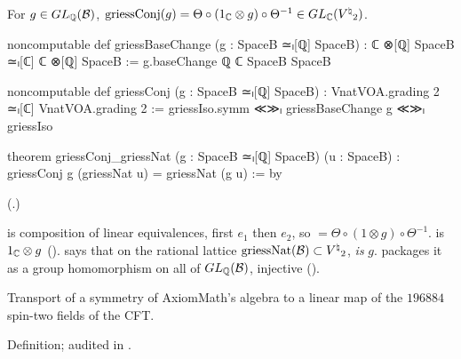 \begin{definition}\label{ch21:def:griessConj}
For $g\in GL_{\mathbb{Q}}(\mathcal{B})$, $\mathrm{griessConj}(g)=\Theta\circ(1_{\mathbb{C}}\otimes g)\circ\Theta^{-1}\in GL_{\mathbb{C}}({V^{\natural}}_2)$.
\end{definition}
\begin{leancode}
noncomputable def griessBaseChange (g : SpaceB ≃ₗ[ℚ] SpaceB) : ℂ ⊗[ℚ] SpaceB ≃ₗ[ℂ] ℂ ⊗[ℚ] SpaceB :=
  g.baseChange ℚ ℂ SpaceB SpaceB
\end{leancode}
\begin{leancode}
noncomputable def griessConj (g : SpaceB ≃ₗ[ℚ] SpaceB) :
    VnatVOA.grading 2 ≃ₗ[ℂ] VnatVOA.grading 2 :=
  griessIso.symm ≪≫ₗ griessBaseChange g ≪≫ₗ griessIso
\end{leancode}
\begin{leancode}
theorem griessConj_griessNat (g : SpaceB ≃ₗ[ℚ] SpaceB) (u : SpaceB) :
    griessConj g (griessNat u) = griessNat (g u) := by
\end{leancode}
(.)
\begin{dictionary}
 is composition of linear equivalences, first $e_1$ then $e_2$, so 
$=\Theta\circ(1\otimes g)\circ\Theta^{-1}$.   is $1_{\mathbb{C}}\otimes g$
().   says
that on the rational lattice $\mathrm{griessNat}(\mathcal{B})\subset{V^{\natural}}_2$,  \emph{is} $g$.
 packages it as a group homomorphism on all of $GL_{\mathbb{Q}}(\mathcal{B})$, injective
().
\end{dictionary}
\begin{physics}
Transport of a symmetry of AxiomMath's algebra to a linear map of the $196884$ spin-two fields of the CFT.
\end{physics}
\begin{status}
Definition; audited in .
\end{status}

